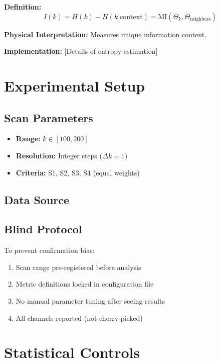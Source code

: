 \documentclass[11pt,a4paper]{article}
\begin{document}
\textbf{Definition:}
\begin{equation}
I(k) = H(k) - H(k|\text{context}) = \text{MI}(\Theta_k, \Theta_{\text{neighbors}})
\end{equation}

\textbf{Physical Interpretation:} Measures unique information content.

\textbf{Implementation:} [Details of entropy estimation]

\section{Experimental Setup}

\subsection{Scan Parameters}

\begin{itemize}
    \item \textbf{Range:} $k \in [100, 200]$
    \item \textbf{Resolution:} Integer steps ($\Delta k = 1$)
    \item \textbf{Criteria:} S1, S2, S3, S4 (equal weights)
\end{itemize}

\subsection{Data Source}


\subsection{Blind Protocol}

To prevent confirmation bias:
\begin{enumerate}
    \item Scan range pre-registered before analysis
    \item Metric definitions locked in configuration file
    \item No manual parameter tuning after seeing results
    \item All channels reported (not cherry-picked)
\end{enumerate}

\section{Statistical Controls}
\end{document}
